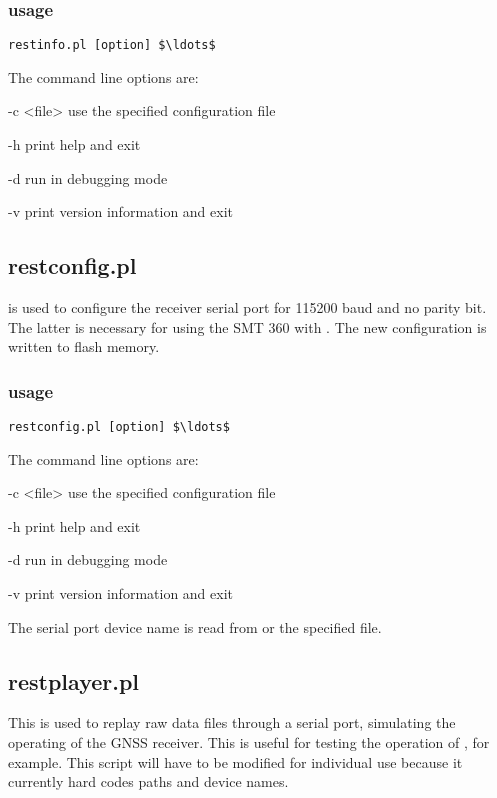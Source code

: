 \subsubsection{usage}

\begin{lstlisting}[mathescape=true]
restinfo.pl [option] $\ldots$ 
\end{lstlisting}

The command line options are:
\begin{description*}
	\item[-c \textless{file}\textgreater] use the specified configuration file
	\item[-h] print help and exit
	\item[-d] run in debugging mode
	\item[-v] print version information and exit
\end{description*}

\subsection{restconfig.pl} \hypertarget{h:restconfig}{}

 is used to configure the receiver serial port for 115200 baud and no parity bit.
The latter is necessary for using the SMT 360 with .
The new configuration is written to flash memory.

\subsubsection{usage}

\begin{lstlisting}[mathescape=true]
restconfig.pl [option] $\ldots$ 
\end{lstlisting}

The command line options are:
\begin{description*}
	\item[-c \textless{file}\textgreater] use the specified configuration file
	\item[-h] print help and exit
	\item[-d] run in debugging mode
	\item[-v] print version information and exit
\end{description*}

The serial port device name is read from  or the specified file. 

\subsection{restplayer.pl} \hypertarget{h:restplayer}{}

This is used to replay raw data files through a serial port, simulating the 
operating of the GNSS receiver. This is useful for testing the operation of 
, for example. This script will have to be modified for individual 
use because it currently hard codes paths and device names. 
